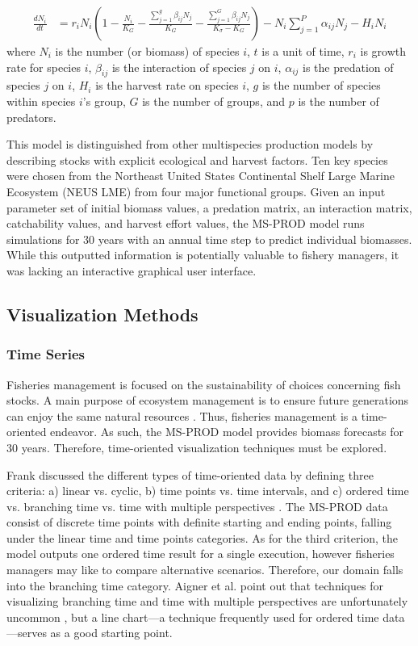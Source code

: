 \documentclass{article}
\begin{document}
\begin{align}
\frac{d N_i}{dt} &= r_i N_i \left(1 - \frac{N_i}{K_G} - \frac{\displaystyle\sum\limits_{j=1}^g \beta_{ij} N_j}{K_G} - \frac{\displaystyle\sum\limits_{j=1}^G \beta_{ij} N_j}{K_{\sigma} - K_G}\right) - N_i \displaystyle\sum\limits_{j=1}^P \alpha_{ij} N_j - H_i N_i
\end{align}
where $N_i$ is the number (or biomass) of species $i$, $t$ is a unit of time, $r_i$ is growth rate for species $i$, $\beta_{ij}$ is the interaction of species $j$ on $i$, $\alpha_{ij}$ is the predation of species $j$ on $i$, $H_i$ is the harvest rate on species $i$, $g$ is the number of species within species $i$'s group, $G$ is the number of groups, and $p$ is the number of predators.

This model is distinguished from other multispecies production models by describing stocks with explicit ecological and harvest factors.  Ten key species were chosen from the Northeast United States Continental Shelf Large Marine Ecosystem (NEUS LME) from four major functional groups.  Given an input parameter set of initial biomass values, a predation matrix, an interaction matrix, catchability values, and harvest effort values, the MS-PROD model runs simulations for 30 years with an annual time step to predict individual biomasses.  While this outputted information is potentially valuable to fishery managers, it was lacking an interactive graphical user interface.  

\subsection{Visualization Methods}

\subsubsection{Time Series}

Fisheries management is focused on the sustainability of choices concerning fish stocks.  A main purpose of ecosystem management is to ensure future generations can enjoy the same natural resources \cite{Christensen1996Report}.  Thus, fisheries management is a time-oriented endeavor.  As such, the MS-PROD model provides biomass forecasts for 30 years.  Therefore, time-oriented visualization techniques must be explored.

Frank discussed the different types of time-oriented data by defining three criteria: a) linear vs. cyclic, b) time points vs. time intervals, and c) ordered time vs. branching time vs. time with multiple perspectives \cite{frank98times}.  The MS-PROD data consist of discrete time points with definite starting and ending points, falling under the linear time and time points categories.  As for the third criterion, the model outputs one ordered time result for a single execution, however fisheries managers may like to compare alternative scenarios.  Therefore, our domain falls into the branching time category.  Aigner et al. point out that techniques for visualizing branching time and time with multiple perspectives are unfortunately uncommon \cite{Aigner08visualmethods}, but a line chart---a technique frequently used for ordered time data---serves as a good starting point.
\end{document}
